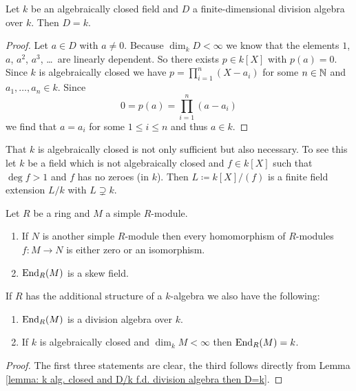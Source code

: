 \begin{lemma}\label{lemma: k alg. closed and D/k f.d. division algebra then D=k}
  Let $k$ be an algebraically closed field and $D$ a finite-dimensional division algebra over $k$.
  Then $D = k$.
\end{lemma}
\begin{proof}
  Let $a \in D$ with $a \neq 0$.
  Because $\dim_k D < \infty$ we know that the elements $1$, $a$, $a^2$, $a^3$, \dots\ are linearly dependent.
  So there exists $p \in k[X]$ with $p(a) = 0$.
  Since $k$ is algebraically closed we have $p = \prod_{i=1}^n (X-a_i)$ for some $n \in \mathbb{N}$ and $a_1, \dotsc, a_n \in k$.
  Since
  \[
      0
    = p(a)
    = \prod_{i=1}^n (a-a_i)
  \]
  we find that $a = a_i$ for some $1 \leq i \leq n$ and thus $a \in k$.
\end{proof}


\begin{remark}
  That $k$ is algebraically closed is not only sufficient but also necessary.
  To see this let $k$ be a field which is not algebraically closed and $f \in k[X]$ such that $\deg f > 1$ and $f$ has no zeroes (in $k$).
  Then $L \coloneqq k[X]/(f)$ is a finite field extension $L/k$ with $L \supsetneq k$.
\end{remark}


\begin{lemma}
  Let $R$ be a ring and $M$ a simple $R$-module.
  \begin{enumerate}[label=\emph{\alph*)},leftmargin=*]
    \item
      If $N$ is another simple $R$-module then every homomorphism of $R$-modules $f \colon M \to N$ is either zero or an isomorphism.
    \item
      $\operatorname{End}_R(M)$ is a skew field.
  \end{enumerate}
  If $R$ has the additional structure of a $k$-algebra we also have the following:
  \begin{enumerate}[label=\emph{\alph*)},leftmargin=*,resume]
    \item
      $\operatorname{End}_R(M)$ is a division algebra over $k$.
    \item
      If $k$ is algebraically closed and $\dim_k M < \infty$ then $\operatorname{End}_R(M) = k$.
  \end{enumerate}
\end{lemma}
\begin{proof}
  The first three statements are clear, the third follows directly from Lemma \ref{lemma: k alg. closed and D/k f.d. division algebra then D=k}.
\end{proof}


